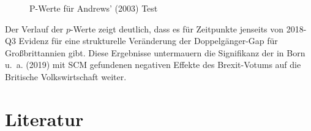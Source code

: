 \documentclass[
  a4paper,
  DIV=11,
  oneside]{scrreprt}
\begin{document}
\begin{figure}[t]


\caption{\label{fig-andrewspvals}P-Werte für Andrews' (2003) Test}

\end{figure}%

Der Verlauf der \(p\)-Werte zeigt deutlich, dass es für Zeitpunkte
jenseits von 2018-Q3 Evidenz für eine strukturelle Veränderung der
Doppelgänger-Gap für Großbrittannien gibt. Diese Ergebnisse untermauern
die Signifikanz der in Born u.~a. (2019) mit SCM gefundenen negativen
Effekte des Brexit-Votums auf die Britische Volkswirtschaft weiter.


\chapter*{Literatur}\label{literatur}

\end{document}
